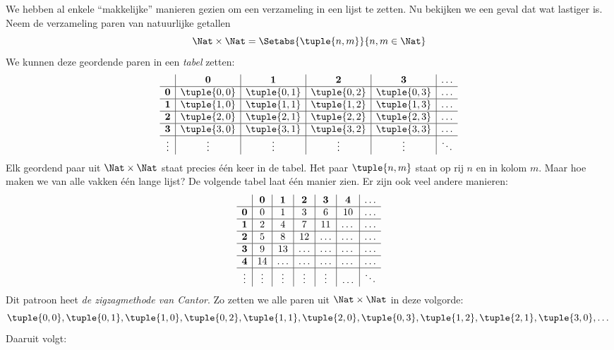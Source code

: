 \documentclass[openany]{memoir}
\begin{document}
\begin{explain}
We hebben al enkele ``makkelijke'' manieren gezien om een verzameling in een
lijst te zetten. Nu bekijken we een geval dat wat lastiger is. Neem de
verzameling paren van natuurlijke getallen
\[
\Nat \times \Nat = \Setabs{\tuple{n,m}}{n,m \in \Nat}
\]
We kunnen deze geordende paren in een \emph{tabel} zetten:
\[
\begin{array}{ c | c | c | c | c | c}
& \mathbf 0 & \mathbf 1 & \mathbf 2 & \mathbf 3 & \dots \\
\hline
\mathbf 0 & \tuple{0,0} & \tuple{0,1} & \tuple{0,2} & \tuple{0,3} & \dots \\
\hline
\mathbf 1 & \tuple{1,0} & \tuple{1,1} & \tuple{1,2} & \tuple{1,3} & \dots \\
\hline
\mathbf 2 & \tuple{2,0} & \tuple{2,1} & \tuple{2,2} & \tuple{2,3} & \dots \\
\hline
\mathbf 3 & \tuple{3,0} & \tuple{3,1} & \tuple{3,2} & \tuple{3,3} & \dots \\
\hline
\vdots & \vdots & \vdots & \vdots & \vdots & \ddots\\
\end{array}
\]
Elk geordend paar uit $\Nat \times \Nat$ staat precies één keer in de tabel.
Het paar $\tuple{n,m}$ staat op rij $n$ en in kolom $m$. Maar hoe maken we van
alle vakken één lange lijst? De volgende tabel laat één manier zien. Er zijn
ook veel andere manieren:
\[
\begin{array}{ c | c | c | c | c | c | c}
& \mathbf 0 & \mathbf 1 & \mathbf 2 & \mathbf 3 & \mathbf 4 &\dots \\
\hline
\mathbf 0 & 0  & 1& 3 & 6& 10 &\ldots \\
\hline
\mathbf 1 &2 & 4& 7 & 11 & \dots &\ldots \\
\hline
\mathbf 2 & 5 & 8 & 12 & \ldots & \dots&\ldots \\
\hline
\mathbf 3 & 9 & 13 & \ldots & \ldots & \dots & \ldots \\
\hline
\mathbf 4 & 14 & \ldots & \ldots & \ldots & \dots & \ldots \\
\hline
\vdots & \vdots & \vdots & \vdots & \vdots&\ldots & \ddots\\
\end{array}
\]\noindent
Dit patroon heet \emph{de zigzagmethode van Cantor}. Zo zetten we alle paren uit
$\Nat \times \Nat$ in deze volgorde:
\[
\tuple{0,0}, \tuple{0,1}, \tuple{1,0}, \tuple{0,2}, \tuple{1,1},
\tuple{2,0}, \tuple{0,3}, \tuple{1,2}, \tuple{2,1}, \tuple{3,0}, \dots
\]
Daaruit volgt:
\end{explain}
\end{document}
